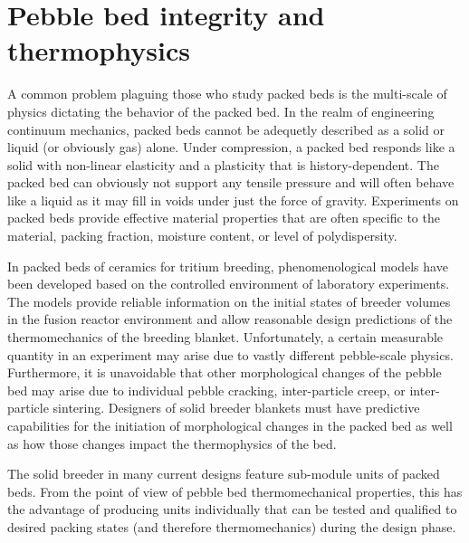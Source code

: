 \section{Pebble bed integrity and thermophysics}\label{sec:intro-bed-integrity}

A common problem plaguing those who study packed beds is the multi-scale of physics dictating the behavior of the packed bed. In the realm of engineering continuum mechanics, packed beds cannot be adequetly described as a solid or liquid (or obviously gas) alone. Under compression, a packed bed responds like a solid with non-linear elasticity and a plasticity that is history-dependent. The packed bed can obviously not support any tensile pressure and will often behave like a liquid as it may fill in voids under just the force of gravity. Experiments on packed beds provide effective material properties that are often specific to the material, packing fraction, moisture content, or level of polydispersity.

In packed beds of ceramics for tritium breeding, phenomenological models have been developed based on the controlled environment of laboratory experiments. The models provide reliable information on the initial states of breeder volumes in the fusion reactor environment and allow reasonable design predictions of the thermomechanics of the breeding blanket. Unfortunately, a certain measurable quantity in an experiment may arise due to vastly different pebble-scale physics. Furthermore, it is unavoidable that other morphological changes of the pebble bed may arise due to individual pebble cracking, inter-particle creep, or inter-particle sintering. Designers of solid breeder blankets must have predictive capabilities for the initiation of morphological changes in the packed bed as well as how those changes impact the thermophysics of the bed.

The solid breeder in many current designs feature sub-module units of packed beds. From the point of view of pebble bed thermomechanical properties, this has the advantage of producing units individually that can be tested and qualified to desired packing states (and therefore thermomechanics) during the design phase. 



